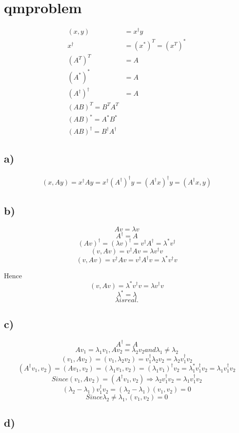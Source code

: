 \section*{qmproblem}
\begin{align*}
 (x,y)&=x^{\dag}y \\
 x^{\dag}&=(x^*)^T=(x^T)^* \\
  \left(A^T\right)^T&=A \\
 \left(A^*\right)^*&=A \\
 \left(A^\dag\right)^\dag&=A \\ 
 \left(AB\right)^T=B^TA^T \\
 \left(AB\right)^*=A^*B^* \\
 \left(AB\right)^\dag=B^\dag A^\dag
\end{align*}
\subsection*{a)}
\begin{align*}
(x,Ay)=x^\dag Ay=x^\dag \left(A^\dag \right )^\dag y=\left(A^{\dag}x \right )^\dag y=(A^\dag x,y)
\end{align*}
\subsection*{b)}
\[ Av=\lambda v \]\[ A^\dag=A\]
\[ \left(Av\right)^\dag=\left(\lambda v\right)^\dag=v^\dag A^\dag=\lambda^*v^\dag \]
\[
\left(v,Av \right )=v^\dag Av=\lambda v^\dag v
\]
\[
\left(v,Av \right )=v^\dag Av=v^\dag A^\dag v=\lambda^* v^\dag v
\]

Hence \[ \left(v,Av \right )=\lambda^* v^\dag v=\lambda v^\dag v
\]
\[
\lambda^*=\lambda \]\[ \lambda is real.
\]
\subsection*{c)}
\[
A^\dag=A
\]
\[
Av_1=\lambda_1v_1, Av_2=\lambda_2v_2 and \lambda_1\ne\lambda_2
\]
\[
\left(v_1,Av_2 \right )=\left(v_1,\lambda_2v_2 \right )=v_1^\dag\lambda_2v_2=\lambda_2 v_1^\dag v_2
\]
\[
\left(A^\dag v_1,v_2 \right )=\left(A v_1,v_2 \right )=\left(\lambda_1v_1,v_2 \right )=(\lambda_1v_1)^\dag v_2=\lambda_1^*v_1^\dag v_2=\lambda_1v_1^\dag v_2
\]
\[
Since \left(v_1,Av_2 \right )=\left(A^\dag v_1,v_2 \right )\Rightarrow \lambda_2 v_1^\dag v_2=\lambda_1v_1^\dag v_2
\]
\[
(\lambda_2-\lambda_1) v_1^\dag v_2=(\lambda_2-\lambda_1) (v_1, v_2)=0
\]
\[
Since \lambda_2\ne\lambda_1 ,  (v_1, v_2)=0
\]
\subsection*{d)}
